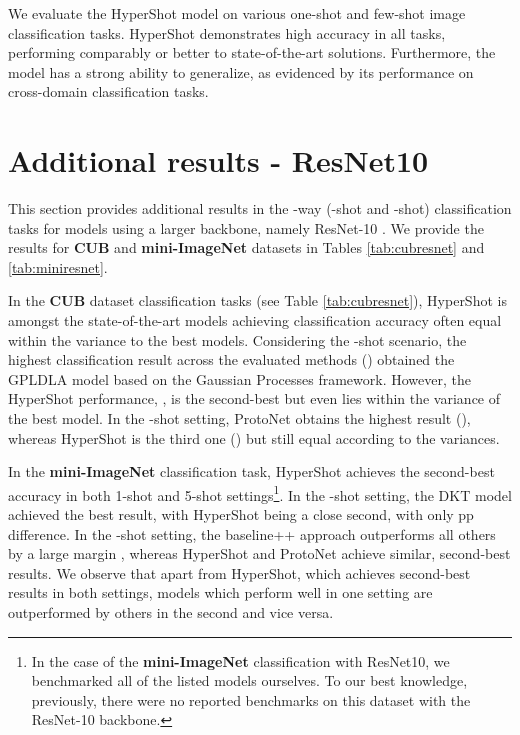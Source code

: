 \documentclass[nohyperref]{article}
\def\our{HyperShot}
\theoremstyle{plain}
\theoremstyle{definition}
\theoremstyle{remark}
\begin{document}
We evaluate the \our{} model on various one-shot and few-shot image classification tasks. \our{} demonstrates high accuracy in all tasks, performing comparably or better to state-of-the-art solutions. Furthermore, the model has a strong ability to generalize, as evidenced by its performance on cross-domain classification tasks.





\newpage
\appendix
\onecolumn
\section{Additional results - ResNet10}
\label{app:resnet}

This section provides additional results in the -way (-shot and -shot) classification tasks for models using a larger backbone, namely ResNet-10 \cite{he2015resnet}. We provide the results for \textbf{CUB} and \textbf{mini-ImageNet} datasets in Tables \ref{tab:cubresnet} and \ref{tab:miniresnet}. 


In the \textbf{CUB} dataset classification tasks (see Table \ref{tab:cubresnet}), \our{} is amongst the state-of-the-art models achieving classification accuracy often equal within the variance to the best models. Considering the -shot scenario, the highest classification result across the evaluated methods () obtained the GPLDLA model based on the Gaussian Processes framework. However, the \our{} performance, , is the second-best but even lies within the variance of the best model. In the -shot setting, ProtoNet obtains the highest result (), whereas \our{} is the third one () but still equal according to the variances.

In the \textbf{mini-ImageNet} classification task, \our{} achieves the second-best accuracy in both 1-shot and 5-shot settings\footnote{In the case of the \textbf{mini-ImageNet} classification with ResNet10, we benchmarked all of the listed models ourselves. To our best knowledge, previously, there were no reported benchmarks on this dataset with the ResNet-10 backbone.}. In the -shot setting, the DKT model \cite{patacchiola2020bayesian} achieved the best result, with \our{} being a close second, with only  pp difference. In the -shot setting, the baseline++ approach outperforms all others by a large margin \cite{chen2019closer}, whereas \our{} and ProtoNet \cite{snell2017prototypical} achieve similar, second-best results. We observe that apart from \our{}, which achieves second-best results in both settings, models which perform well in one setting are outperformed by others in the second and vice versa.
\end{document}
